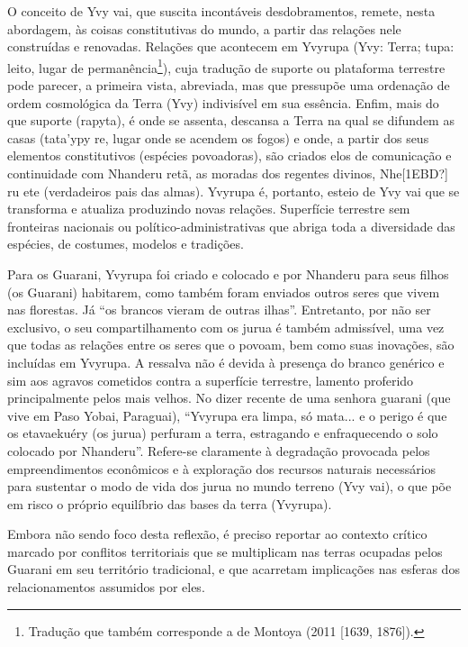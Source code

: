\documentclass{article}
\begin{document}
O conceito de Yvy vai, que suscita incont\'aveis desdobramentos, remete,
nesta abordagem, \`as coisas constitutivas do mundo, a partir das
rela\c{c}\~oes nele constru\'idas e renovadas. Rela\c{c}\~oes que
acontecem em Yvyrupa (Yvy: Terra; tupa: leito, lugar de
perman\^encia\footnote{ Tradu\c{c}\~ao que tamb\'em corresponde a de
Montoya (2011 [1639, 1876]). }), cuja tradu\c{c}\~ao de suporte ou
plataforma terrestre pode parecer, a primeira vista, abreviada, mas que
pressup\~oe uma ordena\c{c}\~ao de ordem cosmol\'ogica da Terra (Yvy)
indivis\'ivel em sua ess\^encia. Enfim, mais do que suporte (rapyta),
\'e onde se assenta, descansa a Terra na qual se difundem as casas
(tata{\textquoteright}ypy re, lugar onde se acendem os fogos) e onde, a
partir dos seus elementos constitutivos (esp\'ecies povoadoras), s\~ao
criados elos de comunica\c{c}\~ao e continuidade com Nhanderu ret\~a,
as moradas dos regentes divinos, Nhe[1EBD?] ru ete (verdadeiros pais
das almas). Yvyrupa \'e, portanto, esteio de Yvy vai que se transforma
e atualiza produzindo novas rela\c{c}\~oes. Superf\'icie terrestre sem
fronteiras nacionais ou pol\'itico-administrativas que abriga toda a
diversidade das esp\'ecies, de costumes, modelos e tradi\c{c}\~oes. 

Para os Guarani, Yvyrupa foi criado e colocado e por Nhanderu para seus
filhos (os Guarani) habitarem, como tamb\'em foram enviados outros
seres que vivem nas florestas. J\'a {\textquotedblleft}os brancos
vieram de outras ilhas{\textquotedblright}. Entretanto, por n\~ao ser
exclusivo, o seu compartilhamento com os jurua \'e tamb\'em
admiss\'ivel, uma vez que todas as rela\c{c}\~oes entre os seres que o
povoam, bem como suas inova\c{c}\~oes, s\~ao inclu\'idas em Yvyrupa. A
ressalva n\~ao \'e devida \`a presen\c{c}a do branco gen\'erico e sim
aos agravos cometidos contra a superf\'icie terrestre, lamento
proferido principalmente pelos mais velhos. No dizer recente de uma
senhora guarani (que vive em Paso Yobai, Paraguai),
{\textquotedblleft}Yvyrupa era limpa, s\'o mata... e o perigo \'e que
os etavaeku\'ery (os jurua) perfuram a terra, estragando e
enfraquecendo o solo colocado por Nhanderu{\textquotedblright}.
Refere-se claramente \`a degrada\c{c}\~ao provocada pelos
empreendimentos econ\^omicos e \`a explora\c{c}\~ao dos recursos
naturais necess\'arios para sustentar o modo de vida dos jurua no mundo
terreno (Yvy vai), o que p\~oe em risco o pr\'oprio equil\'ibrio das
bases da terra (Yvyrupa). 

Embora n\~ao sendo foco desta reflex\~ao, \'e preciso reportar ao
contexto cr\'itico marcado por conflitos territoriais que se
multiplicam nas terras ocupadas pelos Guarani em seu territ\'orio
tradicional, e que acarretam implica\c{c}\~oes nas esferas dos
relacionamentos assumidos por eles. 
\end{document}
